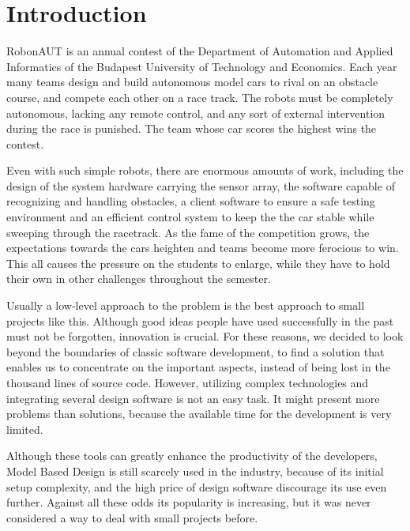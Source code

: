 \section{Introduction}
\label{sec:Introduction}


RobonAUT is an annual contest of the Department of Automation and Applied Informatics of the Budapest University of Technology and Economics. Each year many teams design and build autonomous model cars to rival on an obstacle course, and compete each other on a race track. The robots must be completely autonomous, lacking any remote control, and any sort of external intervention during the race is punished. The team whose car scores the highest wins the contest\cite{rules}.


Even with such simple robots, there are enormous amounts of work, including the design of the system hardware carrying the sensor array, the software capable of recognizing and handling obstacles, a client software to ensure a safe testing environment and an efficient control system to keep the the car stable while sweeping through the racetrack\cite{robonauttdk}. As the fame of the competition grows, the expectations towards the cars heighten and teams become more ferocious to win. This all causes the pressure on the students to enlarge, while they have to hold their own in other challenges throughout the semester.


Usually a low-level approach to the problem is the best approach to small projects like this. Although good ideas people have used successfully in the past must not be forgotten, innovation is crucial. For these reasons, we decided to look beyond the boundaries of classic software development, to find a solution that enables us to concentrate on the important aspects, instead of being lost in the thousand lines of source code. However, utilizing complex technologies and integrating several design software is not an easy task. It might present more problems than solutions, because the available time for the development is very limited.


Although these tools can greatly enhance the productivity of the developers, Model Based Design is still scarcely used in the industry, because of its initial setup complexity, and the high price of design software discourage its use even further. Against all these odds its popularity is increasing, but it was never considered a way to deal with small projects before.

